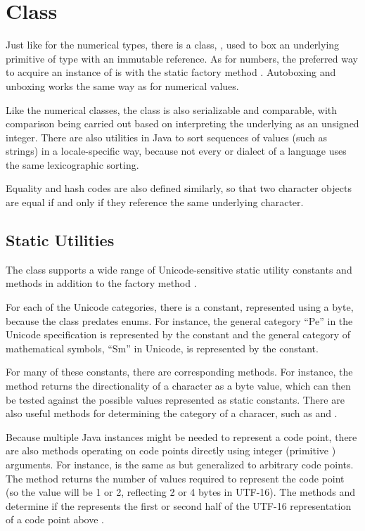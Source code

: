 \section{ Class}

Just like for the numerical types, there is a class,
, used to box an underlying primitive
of type  with an immutable reference.  As for numbers, the
preferred way to acquire an instance of  is with the
static factory method .  Autoboxing and
unboxing works the same way as for numerical values.  

Like the numerical classes, the  class is also
serializable and comparable, with comparison being carried out based
on interpreting the underlying  as an unsigned integer.
There are also utilities in Java to sort sequences of 
values (such as strings) in a locale-specific way, because not every
or dialect of a language uses the same lexicographic sorting.

Equality and hash codes are also defined similarly, so that two
character objects are equal if and only if they reference the same
underlying character.

\subsection{Static Utilities}\label{section:char-character-utils}

The  class supports a wide range of Unicode-sensitive
static utility constants and methods in addition to the factory method
.

For each of the Unicode categories, there is a constant, represented
using a byte, because the class predates enums.  For instance, the
general category ``Pe'' in the Unicode specification is represented by
the constant  and the general category of
mathematical symbols, ``Sm'' in Unicode, is represented by the
constant.

For many of these constants, there are corresponding methods.  For
instance, the method  returns the
directionality of a character as a byte value, which can then be tested
against the possible values represented as static constants.  There
are also useful methods for determining the category of a characer,
such as  and .

Because multiple Java  instances might be needed to
represent a code point, there are also methods operating on code
points directly using integer (primitive ) arguments.  For
instance,  is the same as 
but generalized to arbitrary code points.  The method
 returns the number of  values
required to represent the code point (so the value will be 1 or 2,
reflecting 2 or 4 bytes in UTF-16).  The methods
 and  determine
if the  represents the first or second half of the UTF-16
representation of a code point above .  

